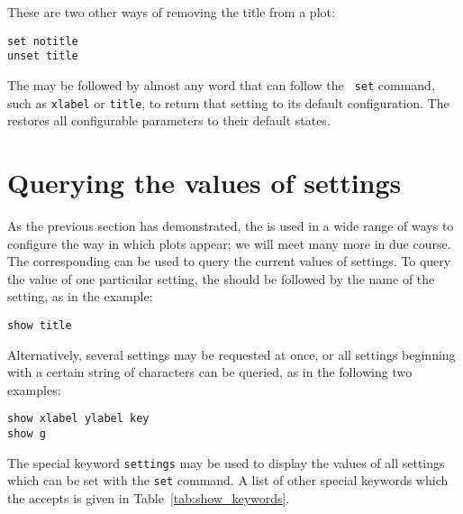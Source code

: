 \noindent These are two other ways of removing the title from a plot:

\begin{verbatim}
set notitle
unset title
\end{verbatim}

The  may be followed by almost any word that can follow the {\tt
set} command, such as {\tt xlabel} or {\tt title}, to return that setting to
its default configuration. The  restores all configurable
parameters to their default states.

\section{Querying the values of settings}

As the previous section has demonstrated, the  is used in a wide
range of ways to configure the way in which plots appear; we will meet many
more in due course. The corresponding  can be used to query the
current values of settings. To query the value of one particular setting, the
 should be followed by the name of the setting, as in the
example:

\begin{verbatim}
show title
\end{verbatim}

\noindent Alternatively, several settings may be requested at once, or all
settings beginning with a certain string of characters can be queried, as in
the following two examples:

\begin{verbatim}
show xlabel ylabel key
show g
\end{verbatim}

\noindent The special keyword {\tt settings} may be used to display the values
of all settings which can be set with the {\tt set} command. A list of other
special keywords which the  accepts is given in
Table~\ref{tab:show_keywords}.

